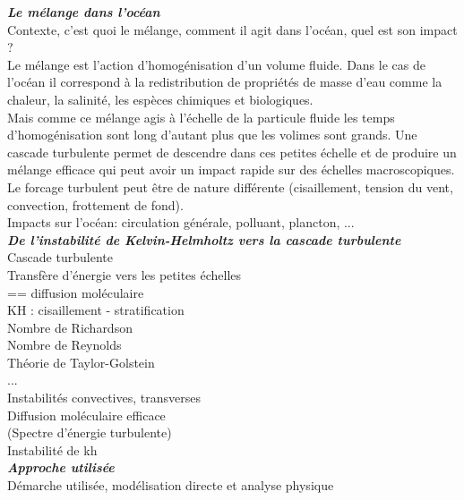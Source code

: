 \documentclass[a4paper,12pt]{article}
\begin{document}
    \textbf{\textit{Le mélange dans l'océan}} \\
    Contexte, c'est quoi le mélange, comment il agit dans l'océan, quel est son impact ? \\
    Le mélange est l'action d'homogénisation d'un volume fluide. Dans le cas de l'océan il correspond à la redistribution de propriétés de masse d'eau comme la chaleur, la salinité, les espèces chimiques et biologiques. \\
    Mais comme ce mélange agis à l'échelle de la particule fluide les temps d'homogénisation sont long d'autant plus que les volimes sont grands. Une cascade turbulente permet de descendre dans ces petites échelle et de produire un mélange efficace qui peut avoir un impact rapide sur des échelles macroscopiques. \\
    Le forcage turbulent peut être de nature différente (cisaillement, tension du vent, convection, frottement de fond). \\
    Impacts sur l'océan: circulation générale, polluant, plancton, ... \\
    \newline
    \textbf{\textit{De l'instabilité de Kelvin-Helmholtz vers la cascade turbulente}} \\
    Cascade turbulente \\
    Transfère d'énergie vers les petites échelles \\
    == diffusion moléculaire \\
    KH : cisaillement - stratification \\
    Nombre de Richardson \\
    Nombre de Reynolds \\
    Théorie de Taylor-Golstein \\
    ... \\
    Instabilités convectives, transverses \\
    Diffusion moléculaire efficace \\
    (Spectre d'énergie turbulente) \\
    Instabilité de \acrfull{kh} \\
    \newline
    \textbf{\textit{Approche utilisée}} \\
    Démarche utilisée, modélisation directe et analyse physique
\end{document}
